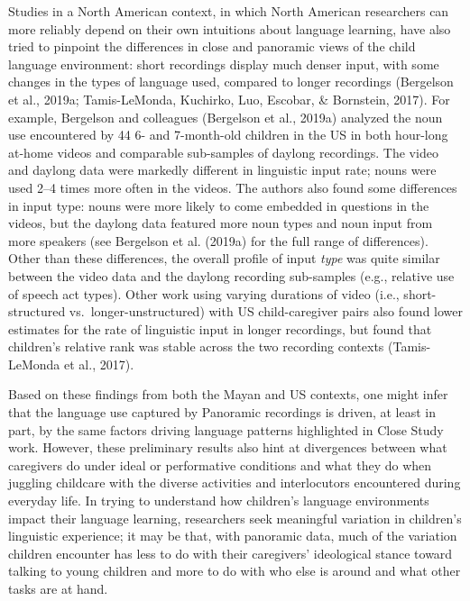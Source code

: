 \documentclass[,man,floatsintext]{apa6}
\begin{document}
Studies in a North American context, in which North American researchers
can more reliably depend on their own intuitions about language
learning, have also tried to pinpoint the differences in close and
panoramic views of the child language environment: short recordings
display much denser input, with some changes in the types of language
used, compared to longer recordings (Bergelson et al., 2019a;
Tamis-LeMonda, Kuchirko, Luo, Escobar, \& Bornstein, 2017). For example,
Bergelson and colleagues (Bergelson et al., 2019a) analyzed the noun use
encountered by 44 6- and 7-month-old children in the US in both
hour-long at-home videos and comparable sub-samples of daylong
recordings. The video and daylong data were markedly different in
linguistic input rate; nouns were used 2--4 times more often in the
videos. The authors also found some differences in input type: nouns
were more likely to come embedded in questions in the videos, but the
daylong data featured more noun types and noun input from more speakers
(see Bergelson et al. (2019a) for the full range of differences). Other
than these differences, the overall profile of input \emph{type} was
quite similar between the video data and the daylong recording
sub-samples (e.g., relative use of speech act types). Other work using
varying durations of video (i.e., short-structured
vs.~longer-unstructured) with US child-caregiver pairs also found lower
estimates for the rate of linguistic input in longer recordings, but
found that children's relative rank was stable across the two recording
contexts (Tamis-LeMonda et al., 2017).

Based on these findings from both the Mayan and US contexts, one might
infer that the language use captured by Panoramic recordings is driven,
at least in part, by the same factors driving language patterns
highlighted in Close Study work. However, these preliminary results also
hint at divergences between what caregivers do under ideal or
performative conditions and what they do when juggling childcare with
the diverse activities and interlocutors encountered during everyday
life. In trying to understand how children's language environments
impact their language learning, researchers seek meaningful variation in
children's linguistic experience; it may be that, with panoramic data,
much of the variation children encounter has less to do with their
caregivers' ideological stance toward talking to young children and more
to do with who else is around and what other tasks are at hand.
\end{document}
